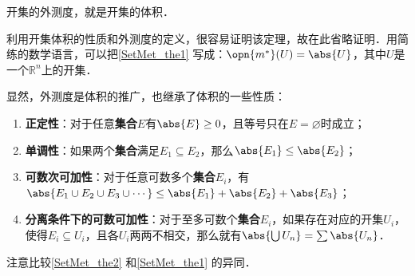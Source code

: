 \begin{theorem}{}\label{SetMet_the1}
开集的外测度，就是开集的体积．
\end{theorem}

利用开集体积的性质和外测度的定义，很容易证明该定理，故在此省略证明．用简练的数学语言，可以把\autoref{SetMet_the1} 写成：$\opn{m^*}(U)=\abs{U}$，其中$U$是一个$\mathbb{R}^n$上的开集．

显然，外测度是体积的推广，也继承了体积的一些性质：

\begin{theorem}{}
\begin{enumerate}
\item \textbf{正定性}：对于任意\textbf{集合}$E$有$\abs{E}\geq 0$，且等号只在$E=\varnothing$时成立；\\
\item \textbf{单调性}：如果两个\textbf{集合}满足$E_1\subseteq E_2$，那么$\abs{E_1}\leq \abs{E_2}$；\\
\item \textbf{可数次可加性}：对于任意可数多个\textbf{集合}$E_i$，有$\abs{E_1\cup E_2\cup E_3\cup \cdots}\leq \abs{E_1}+\abs{E_2}+\abs{E_3}$；\\
\item \textbf{分离条件下的可数可加性}：对于至多可数个\textbf{集合}$E_i$，如果存在对应的开集$U_i$，使得$E_i\subseteq U_i$，且各$U_i$两两不相交，那么就有$\abs{\bigcup U_n}=\sum\abs{U_n}$．
\end{enumerate}
\end{theorem}

注意比较\autoref{SetMet_the2} 和\autoref{SetMet_the1} 的异同．




















